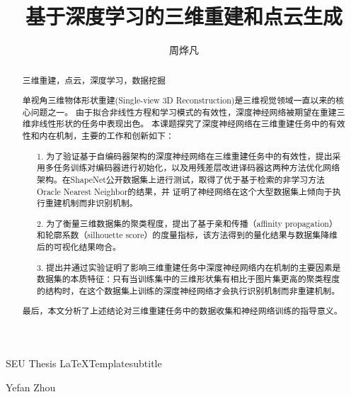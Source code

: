 \documentclass[bachelor, nocolorlinks, printoneside]{seuthesis} %
\begin{document}

\title{基于深度学习的三维重建和点云生成}{}{SEU Thesis \LaTeX Template}{subtitle}
\author{周烨凡}{Yefan Zhou}




\maketitle

\begin{abstract}{三维重建，点云，深度学习，数据挖掘}

    单视角三维物体形状重建(Single-view 3D Reconstruction)是三维视觉领域一直以来的核心问题之一。
    由于拟合非线性方程和学习模式的有效性，深度神经网络被期望在重建三维非线性形状的任务中表现出色。
    本课题探究了深度神经网络在三维重建任务中的有效性和内在机制，主要的工作和创新如下：
        
        \begin{enumerate}
            \item[1.] 为了验证基于自编码器架构的深度神经网络在三维重建任务中的有效性，提出采用多任务训练对编码器进行初始化，以及用残差层改进译码器这两种方法优化网络架构。在ShapeNet公开数据集上进行测试，取得了优于基于检索的非学习方法Oracle Nearest Neighbor的结果，并
            证明了神经网络在这个大型数据集上倾向于执行重建机制而非识别机制。 
            \item[2.] 为了衡量三维数据集的聚类程度，提出了基于亲和传播（affinity propagation）和轮廓系数（silhouette score）的度量指标，该方法得到的量化结果与数据集降维后的可视化结果吻合。
            \item[3.] 提出并通过实验证明了影响三维重建任务中深度神经网络内在机制的主要因素是数据集的本质特征：只有当训练集中的三维形状集有相比于图片集更高的聚类程度的结构时，在这个数据集上训练的深度神经网络才会执行识别机制而非重建机制。
        \end{enumerate}
    最后，本文分析了上述结论对三维重建任务中的数据收集和神经网络训练的指导意义。
    \end{abstract}
\end{document}
